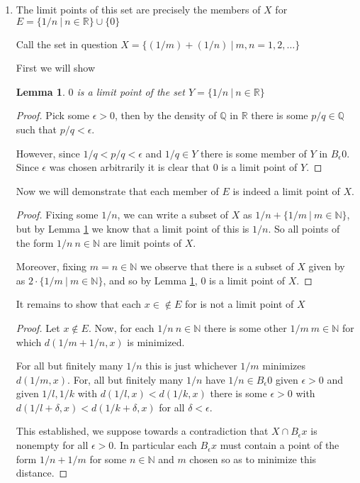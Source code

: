 \documentclass[10pt]{article}
\newtheorem{lemma}[theorem]{Lemma}
\begin{document}
\begin{enumerate}
\item The limit points of this set are precisely the members of $X$ for $E=\{1/n\ |\ n\in\mathbb{R}\} \cup \{0\}$

Call the set in question $X=\{(1/m)+(1/n)\ |\ m,n=1,2,\dots\}$

First we will show 

\begin{lemma}\label{easy}
$0$ is a limit point of the set $Y=\{1/n\ |\ n \in \mathbb{R}\}$
\end{lemma}

\begin{proof}
Pick some $\epsilon>0$, then by the density of $\mathbb{Q}$ in $\mathbb{R}$ there is some $p/q \in \mathbb{Q}$ such that $p/q<\epsilon$. 

However, since  $1/q<p/q<\epsilon$ and $1/q \in Y$ there is some member of $Y$ in $B_\epsilon 0$. Since $\epsilon$ was chosen arbitrarily it is clear that $0$ is a limit point of $Y$.\end{proof}

Now we will demonstrate that each member of $E$ is indeed a limit point of $X$.

\begin{proof}
Fixing some $1/n$, we can write a subset of $X$ as $1/n+\{1/m\ |\ m \in \mathbb{N}\}$, but by Lemma \ref{easy} we know that a limit point of this is $1/n$. So all points of the form $1/n\ n\in\mathbb{N}$ are limit points of $X$.

Moreover, fixing $m=n \in \mathbb{N}$ we observe that there is a subset of $X$ given by as $2 \cdot \{1/m\ |\ m \in \mathbb{N}\}$, and so by Lemma \ref{easy}, $0$ is a limit point of $X$.\end{proof}

It remains to show that each $x\in \notin E$ for is not a limit point of $X$

\begin{proof}Let $x \notin E$. Now, for each $1/n \ n\in\mathbb{N}$ there is some other $1/m\ m\in\mathbb{N}$ for which $d(1/m+1/n,x)$ is minimized.

For all but finitely many $1/n$ this is just whichever $1/m$ minimizes $d(1/m,x)$. For, all but finitely many $1/n$ have $1/n \in B_\epsilon 0 $ given $\epsilon>0$ and given $1/l, 1/k$ with $d(1/l,x) < d(1/k,x)$ there is some $\epsilon >0$ with $d(1/l+\delta,x) < d(1/k+\delta,x)$ for all $\delta<\epsilon$.

This established, we suppose towards a contradiction that $X \cap B_\epsilon x$ is nonempty for all $\epsilon >0$. In particular each $B_\epsilon x$ must contain a point of the form  $1/n+1/m$ for some $n \in \mathbb{N}$ and $m$ chosen so as to minimize this distance. 


\end{proof}
\end{enumerate}
\end{document}
